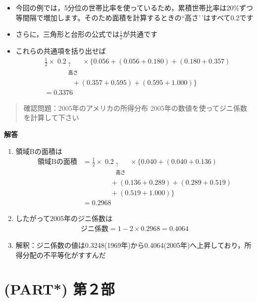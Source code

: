 \documentclass[
]{book}
\theoremstyle{definition}
\theoremstyle{definition}
\theoremstyle{definition}
\theoremstyle{definition}
\theoremstyle{remark}
\begin{document}
\begin{itemize}
\item
  今回の例では，5分位の世帯比率を使っているため，累積世帯比率は20\%ずつ等間隔で増加します。そのため面積を計算するときの``高さ'\,'はすべて0.2です
\item
  さらに，三角形と台形の公式では\(\tfrac{1}{2}\)が共通です
\item
  これらの共通項を括り出せば
  \begin{align*} 
  &\tfrac{1}{2} \times \mathop{0.2}_{\substack{\uparrow \\ \text{高さ}}} \times 
  \{ 0.056+ (0.056+0.180)+ (0.180+0.357) \\
  &\qquad\qquad+(0.357+0.595)+(0.595+1.000) \} \\
  &=0.3376
  \end{align*}
\end{itemize}

\begin{quote}
確認問題：2005年のアメリカの所得分布
2005年の数値を使ってジニ係数を計算して下さい
\end{quote}

\textbf{解答}

\begin{enumerate}
\def\labelenumi{\arabic{enumi}.}
\item
  領域Bの面積は
  \begin{align*}
  \text{領域Bの面積}
  &=\tfrac{1}{2} \times \mathop{0.2}_{\substack{\uparrow \\ \text{高さ}}} \times 
  \{ 0.040+ (0.040+0.136) \\
  &\qquad\qquad+(0.136+0.289)+(0.289+0.519) \\
  &\qquad\qquad+(0.519+1.000) \} \\
  &=0.2968
  \end{align*}
\item
  したがって2005年のジニ係数は
  \begin{align*}
  \text{ジニ係数}
  =1-2 \times 0.2968
  =0.4064
  \end{align*}
\item
  解釈：ジニ係数の値は0.3248(1969年)から0.4064(2005年)へ上昇しており，所得分配の不平等化がすすんだ
\end{enumerate}

\hypertarget{part-ux7b2cuxff12ux90e8}{%
\chapter{(PART*) 第２部}\label{part-ux7b2cuxff12ux90e8}}
\end{document}
